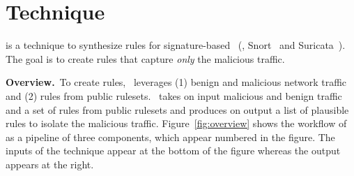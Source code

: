 \documentclass[sigconf,review, anonymous]{acmart}
\begin{document}




\section{Technique}
\label{sec:technique}

\tname{} is a technique to synthesize rules for signature-based
\nids~(\eg{}, Snort~\cite{snort} and Suricata~\cite{suricata}). The
goal is to create rules that capture \emph{only} the
malicious traffic.

\vspace{1ex}
\noindent\textbf{Overview.}~To create rules, \tname\ leverages (1)
benign and malicious network traffic and (2) rules from public
rulesets. \tname\ takes on input malicious and benign traffic and a
set of rules from public rulesets and produces on output a list of
plausible rules to isolate the malicious
traffic. Figure~\ref{fig:overview} shows the workflow of \tname{} as a
pipeline of three components, which appear numbered in the figure.
The inputs of the technique appear at the bottom of the figure whereas
the output appears at the right.
\end{document}
